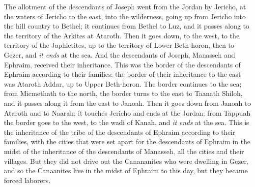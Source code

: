 \begin{biblechapter} %
 The allotment of the descendants of Joseph went from the Jordan by Jericho, at the waters of Jericho to the east, into the wilderness, going up from Jericho into the hill country to Bethel;
\verse it continues from Bethel to Luz, and it passes along to the territory of the Arkites at Ataroth.
\verse Then it goes down, to the west, to the territory of the Japhletites, up to the territory of Lower Beth-horon, then to Gezer, and \textit{it ends} at the sea.
\verse And the descendants of Joseph, Manasseh and Ephraim, received their inheritance.
\verse This was the border of the descendants of Ephraim according to their families: the border of their inheritance to the east was Ataroth Addar, up to Upper Beth-horon.
\verse The border continues to the sea; from Micmethath to the north, the border turns to the east to Taanath Shiloh, and it passes along it from the east to Janoah.
\verse Then it goes down from Janoah to Ataroth and to Naarah; it touches Jericho and ends at the Jordan;
\verse from Tappuah the border goes to the west, to the wadi of Kanah, and \textit{it ends} at the sea. This is the inheritance of the tribe of the descendants of Ephraim according to their families,
\verse with the cities that were set apart for the descendants of Ephraim in the midst of the inheritance of the descendants of Manasseh, all the cities and their villages.
\verse But they did not drive out the Canananites who were dwelling in Gezer, and so the Canaanites live in the midst of Ephraim to this day, but they became forced laborers.
\end{biblechapter}

